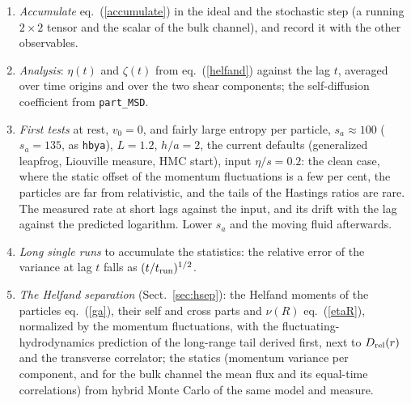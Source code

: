 \documentclass[11pt,aps,preprint,nofootinbib,superscriptaddress,tightenlines]{revtex4-2}
\def\Eq#1{eq.~(\ref{#1})}
\def\Sect#1{Sect.~\ref{#1}}
\begin{document}
\begin{enumerate}
\item \emph{Accumulate} \Eq{accumulate} in the ideal and the stochastic step (a running $2\times2$ tensor and the scalar of the
  bulk channel), and record it with the other observables.
\item \emph{Analysis}: $\eta(t)$ and $\zeta(t)$ from \Eq{helfand} against the lag $t$, averaged over time origins and over the two shear
  components; the self-diffusion coefficient from \texttt{part\_MSD}.
\item \emph{First tests} at rest, $v_0=0$, and fairly large entropy per particle, $s_a\approx100$ ($s_a=135$, as \texttt{hbya}), $L=1.2$, $h/a=2$,
  the current defaults (generalized leapfrog, Liouville measure, HMC start), input $\eta/s=0.2$: the clean case, where the static offset
  of the momentum fluctuations is a few per cent, the particles are far from relativistic, and the tails of the Hastings ratios are
  rare.  The measured rate at short lags against the input, and its drift with the lag against the predicted logarithm.  Lower $s_a$
  and the moving fluid afterwards.
\item \emph{Long single runs} to accumulate the statistics: the relative error of the variance at lag $t$ falls as $(t/t_{\rm run})^{1/2}$.
\item \emph{The Helfand separation} (\Sect{sec:hsep}): the Helfand moments of the particles \Eq{ga}, their self and cross parts and $\nu(R)$ \Eq{etaR},
  normalized by the momentum fluctuations, with the fluctuating-hydrodynamics prediction of the long-range tail derived first, next to
  $D_{\rm rel}(r)$ and the transverse correlator; the statics (momentum variance per component, and for the bulk channel the mean flux and its
  equal-time correlations) from hybrid Monte Carlo of the same model and measure.
\end{enumerate}
\end{document}
